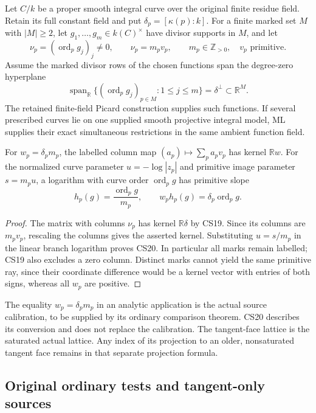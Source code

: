 Let $C/k$ be a proper smooth integral curve over the original
finite residue field.  Retain its full constant field and put
$\delta_p=[\kappa(p):k]$.  For a finite marked set $M$ with
$|M|\geq2$,
let $g_1,\ldots,g_m\in k(C)^\times$ have divisor supports
in $M$, and let
\[
 \nu_p=(\operatorname{ord}_p g_j)_j\ne0,
 \qquad \nu_p=m_pv_p,
 \qquad m_p\in\mathbb Z_{>0},\quad v_p\text{ primitive}.
 \tag{CS18}
\]
Assume the marked divisor rows of the chosen functions span
the degree-zero hyperplane
\[
 \operatorname{span}_{\mathbb R}
       \{(\operatorname{ord}_pg_j)_{p\in M}:1\leq j\leq m\}
             =\delta^\perp\subset\mathbb R^M.
 \tag{CS19}
\]
The retained finite-field Picard construction supplies such
functions.  If several prescribed curves lie on one supplied
smooth projective integral model, ML supplies their exact
simultaneous restrictions in the same ambient function field.

\begin{lemma}
\label{lem:r13-curve-primitive-kernel}
For $w_p=\delta_pm_p$, the labelled column map
$(a_p)\mapsto\sum_pa_pv_p$ has kernel $\mathbb Rw$.
For the normalized curve parameter $u=-\log|z_p|$ and primitive
image parameter $s=m_pu$, a logarithm with curve order
$\operatorname{ord}_p g$ has primitive slope
\[
 h_p(g)=\frac{\operatorname{ord}_p g}{m_p},
      \qquad w_ph_p(g)=\delta_p\operatorname{ord}_p g.
 \tag{CS20}
\]
\end{lemma}

\begin{proof}
The matrix with columns $\nu_p$ has kernel $\mathbb R\delta$
by CS19.  Since its columns are $m_pv_p$, rescaling the columns
gives the asserted kernel.  Substituting $u=s/m_p$ in the
linear branch logarithm proves CS20.  In particular all marks
remain labelled; CS19 also excludes a zero column.  Distinct
marks cannot yield the same primitive ray, since their
coordinate difference would be a kernel vector with entries
of both signs, whereas all $w_p$ are positive.
\end{proof}

The equality $w_p=\delta_pm_p$ in an analytic application is
the actual source calibration, to be supplied by its ordinary
comparison theorem.  CS20 describes its conversion and does
not replace the calibration.  The tangent-face lattice is
the saturated actual lattice.  Any index of its projection
to an older, nonsaturated tangent face remains in that separate
projection formula.

\subsection{Original ordinary tests and tangent-only sources}


